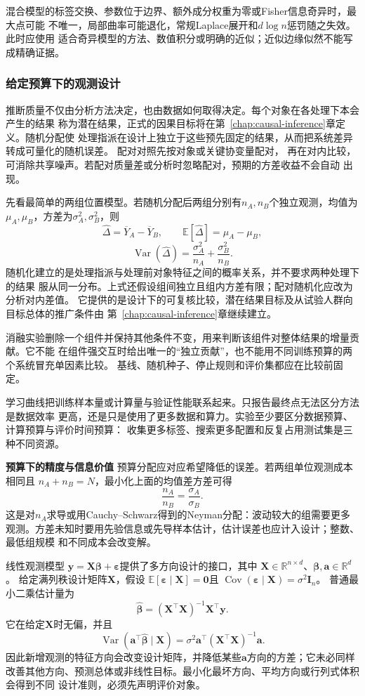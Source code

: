 混合模型的标签交换、参数位于边界、额外成分权重为零或Fisher信息奇异时，最大点可能
不唯一，局部曲率可能退化，常规Laplace展开和\(d\log n\)惩罚随之失效。此时应使用
适合奇异模型的方法、数值积分或明确的近似；近似边缘似然不能写成精确证据。

\subsubsection{给定预算下的观测设计}
\label{sec:statistics-design-information}
推断质量不仅由分析方法决定，也由数据如何取得决定。每个对象在各处理下本会产生的结果
称为潜在结果，正式的因果目标将在第~\ref{chap:causal-inference}章定义。随机分配使
处理指派在设计上独立于这些预先固定的结果，从而把系统差异转成可量化的随机误差。
配对对照先按对象或关键协变量配对，
再在对内比较，可消除共享噪声。若配对质量差或分析时忽略配对，预期的方差收益不会自动
出现。

先看最简单的两组位置模型。若随机分配后两组分别有\(n_A,n_B\)个独立观测，均值为
\(\mu_A,\mu_B\)，方差为\(\sigma_A^2,\sigma_B^2\)，则
\[
  \widehat\Delta=\overline Y_A-\overline Y_B,\qquad
  \mathbb{E}[\widehat\Delta]=\mu_A-\mu_B,
\]
\[
  \operatorname{Var}(\widehat\Delta)
  =\frac{\sigma_A^2}{n_A}+\frac{\sigma_B^2}{n_B}.
\]
随机化建立的是处理指派与处理前对象特征之间的概率关系，并不要求两种处理下的结果
服从同一分布。上式还假设组间独立且组内方差有限；配对随机化应改为分析对内差值。
它提供的是设计下的可复核比较，潜在结果目标及从试验人群向目标总体的推广条件由
第~\ref{chap:causal-inference}章继续建立。

消融实验删除一个组件并保持其他条件不变，用来判断该组件对整体结果的增量贡献。它不能
在组件强交互时给出唯一的“独立贡献”，也不能用不同训练预算的两个系统冒充单因素比较。
基线、随机种子、停止规则和评价集都应在比较前固定。

学习曲线把训练样本量或计算量与验证性能联系起来。只报告最终点无法区分方法是数据效率
更高，还是只是使用了更多数据和算力。实验至少要区分数据预算、计算预算与评价时间预算：
收集更多标签、搜索更多配置和反复占用测试集是三种不同资源。

\par\medskip\noindent\textbf{预算下的精度与信息价值}\quad
预算分配应对应希望降低的误差。若两组单位观测成本相同且
\(n_A+n_B=N\)，最小化上面的均值差方差可得
\[
  \frac{n_A}{n_B}=\frac{\sigma_A}{\sigma_B}.
\]
这是对\(n_A\)求导或用Cauchy--Schwarz得到的Neyman分配：波动较大的组需要更多
观测。方差未知时要用先验信息或先导样本估计，估计误差也应计入设计；整数、最低组规模
和不同成本会改变解。

线性观测模型
\(\bm y=\bm X\bm\beta+\bm\varepsilon\)提供了多方向设计的接口，其中
\(\bm X\in\mathbb{R}^{n\times d}\)、\(\bm\beta,\bm a\in\mathbb{R}^d\)。
给定满列秩设计矩阵\(\bm X\)，假设
\(\mathbb{E}[\bm\varepsilon\mid\bm X]=\bm{0}\)且
\(\operatorname{Cov}(\bm\varepsilon\mid\bm X)=\sigma^2\bm I_n\)。
普通最小二乘估计量为
\[
  \widehat{\bm\beta}
  =(\bm X^\top\bm X)^{-1}\bm X^\top\bm y.
\]
它在给定\(\bm X\)时无偏，并且
\[
  \operatorname{Var}(\bm a^\top\widehat{\bm\beta}\mid\bm X)
  =\sigma^2\bm a^\top(\bm X^\top\bm X)^{-1}\bm a.
\]
因此新增观测的特征方向会改变设计矩阵，并降低某些\(\bm a\)方向的方差；它未必同样
改善其他方向、预测总体或非线性目标。最小化最坏方向、平均方向或行列式体积会得到不同
设计准则，必须先声明评价对象。

